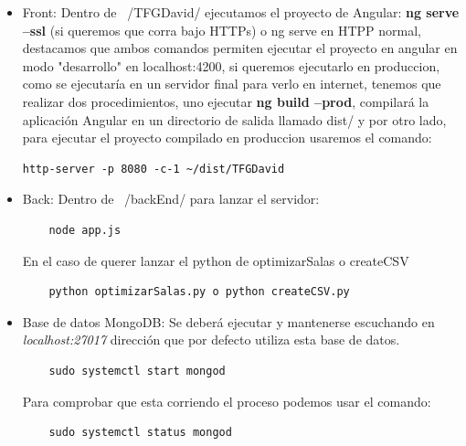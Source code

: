 \documentclass[a4paper, 12pt]{book}
\begin{document}
\begin{itemize}
  \item Front: Dentro de ~/TFGDavid/ ejecutamos el proyecto de Angular:
	\textbf{ng serve --ssl} (si queremos que corra bajo HTTPs) o ng serve en HTPP normal, destacamos que ambos comandos permiten ejecutar el proyecto en angular en modo "desarrollo" en localhost:4200, si queremos ejecutarlo en produccion, como se ejecutaría en un servidor final para verlo en internet, tenemos que realizar dos procedimientos, uno ejecutar \textbf{ng build --prod}, compilará la aplicación Angular en un directorio de salida llamado dist/ y por otro lado, para ejecutar el proyecto compilado en produccion usaremos el comando:
\begin{verbatim}
http-server -p 8080 -c-1 ~/dist/TFGDavid
\end{verbatim}

	
\item Back: Dentro de ~/backEnd/ para lanzar el servidor: 

	\begin{verbatim}
	node app.js
	\end{verbatim}

En el caso de querer lanzar el python de optimizarSalas o createCSV
	\begin{verbatim}
	python optimizarSalas.py o python createCSV.py
	\end{verbatim}
	
\item Base de datos MongoDB: Se deberá ejecutar y mantenerse escuchando en \textit{localhost:27017} dirección que por defecto utiliza esta base de datos.

	\begin{verbatim}
	sudo systemctl start mongod
	\end{verbatim}

Para comprobar que esta corriendo el proceso podemos usar el comando:

	\begin{verbatim}
	sudo systemctl status mongod
	\end{verbatim}

\end{itemize}

\cleardoublepage


\end{document}
